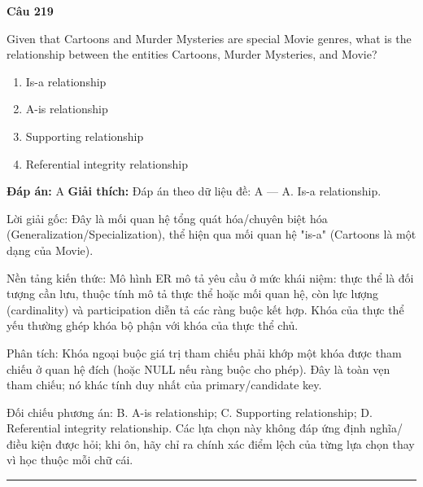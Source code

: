 \documentclass[11pt,a4paper]{article}
\newenvironment{question}[1]{%
  \par\vspace{1em}\noindent\textbf{\large Câu #1}\par\vspace{0.4em}
}{%
  \par\vspace{1em}\hrule\vspace{0.6em}
}
\newenvironment{choices}{%
  \begin{enumerate}[label=\textbf{\Alph*.},leftmargin=2.2em,itemsep=2pt,topsep=3pt]
}{%
  \end{enumerate}
}
\newcommand{\choice}{\item}
\begin{document}
\begin{question}{219}
Given that Cartoons and Murder Mysteries are special Movie genres, what is the relationship between the entities Cartoons, Murder Mysteries, and Movie?
\begin{choices}
\choice Is-a relationship
\choice A-is relationship
\choice Supporting relationship
\choice Referential integrity relationship
\end{choices}
\textbf{Đáp án:} A
\textbf{Giải thích:} Đáp án theo dữ liệu đề: A — A. Is-a relationship.

Lời giải gốc: Đây là mối quan hệ tổng quát hóa/chuyên biệt hóa (Generalization/Specialization), thể hiện qua mối quan hệ "is-a" (Cartoons là một dạng của Movie).

Nền tảng kiến thức: Mô hình ER mô tả yêu cầu ở mức khái niệm: thực thể là đối tượng cần lưu, thuộc tính mô tả thực thể hoặc mối quan hệ, còn lực lượng (cardinality) và participation diễn tả các ràng buộc kết hợp. Khóa của thực thể yếu thường ghép khóa bộ phận với khóa của thực thể chủ.

Phân tích: Khóa ngoại buộc giá trị tham chiếu phải khớp một khóa được tham chiếu ở quan hệ đích (hoặc NULL nếu ràng buộc cho phép). Đây là toàn vẹn tham chiếu; nó khác tính duy nhất của primary/candidate key.

Đối chiếu phương án: B. A-is relationship; C. Supporting relationship; D. Referential integrity relationship. Các lựa chọn này không đáp ứng định nghĩa/điều kiện được hỏi; khi ôn, hãy chỉ ra chính xác điểm lệch của từng lựa chọn thay vì học thuộc mỗi chữ cái.
\end{question}
\end{document}
